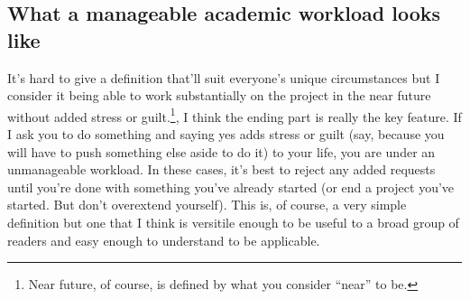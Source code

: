 \documentclass[
  12pt,
]{book}
\begin{document}
\hypertarget{what-a-manageable-academic-workload-looks-like}{%
\subsection{What a manageable academic workload looks like}\label{what-a-manageable-academic-workload-looks-like}}

It's hard to give a definition that'll suit everyone's unique circumstances but I consider it being able to work substantially on the project in the near future without added stress or guilt.\footnote{Near future, of course, is defined by what you consider ``near'' to be.}, I think the ending part is really the key feature. If I ask you to do something and saying yes adds stress or guilt (say, because you will have to push something else aside to do it) to your life, you are under an unmanageable workload. In these cases, it's best to reject any added requests until you're done with something you've already started (or end a project you've started. But don't overextend yourself). This is, of course, a very simple definition but one that I think is versitile enough to be useful to a broad group of readers and easy enough to understand to be applicable.
\end{document}
